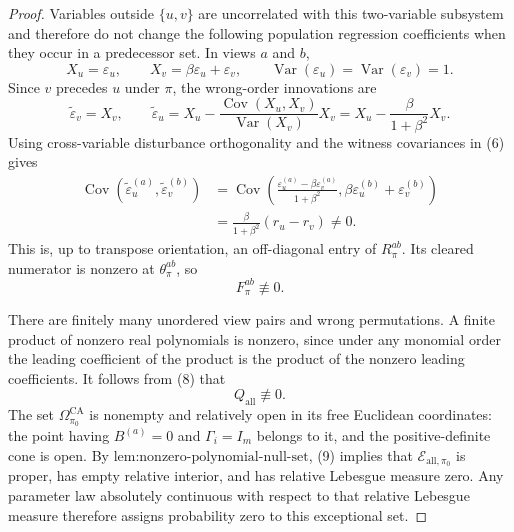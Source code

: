 \documentclass{article}
\begin{document}
\begin{proof}
Variables outside \(\{u,v\}\) are uncorrelated with this two-variable subsystem and therefore do not change the following population regression coefficients when they occur in a predecessor set.  In views \(a\) and \(b\),
\[
X_u=\varepsilon_u,
\qquad
X_v=\beta\varepsilon_u+\varepsilon_v,
\qquad
\operatorname{Var}(\varepsilon_u)=\operatorname{Var}(\varepsilon_v)=1.
\tag{5}
\]
Since \(v\) precedes \(u\) under \(\pi\), the wrong-order innovations are
\[
\widetilde\varepsilon_v=X_v,
\qquad
\widetilde\varepsilon_u
=X_u-\frac{\operatorname{Cov}(X_u,X_v)}{\operatorname{Var}(X_v)}X_v
=X_u-\frac{\beta}{1+\beta^2}X_v.
\tag{6}
\]
Using cross-variable disturbance orthogonality and the witness covariances in (6) gives
\[
\begin{aligned}
\operatorname{Cov}\!\left(\widetilde\varepsilon_u^{(a)},
\widetilde\varepsilon_v^{(b)}\right)
&=\operatorname{Cov}\!\left(
\frac{\varepsilon_u^{(a)}-\beta\varepsilon_v^{(a)}}{1+\beta^2},
\beta\varepsilon_u^{(b)}+\varepsilon_v^{(b)}\right)\\
&=\frac{\beta}{1+\beta^2}(r_u-r_v)\ne0.
\end{aligned}
\tag{7}
\]
This is, up to transpose orientation, an off-diagonal entry of \(R_\pi^{ab}\).  Its cleared numerator is nonzero at \(\theta_\pi^{ab}\), so
\[
F_\pi^{ab}\not\equiv0.
\tag{8}
\]

There are finitely many unordered view pairs and wrong permutations.  A finite product of nonzero real polynomials is nonzero, since under any monomial order the leading coefficient of the product is the product of the nonzero leading coefficients.  It follows from (8) that
\[
Q_{\mathrm{all}}\not\equiv0.
\tag{9}
\]
The set \(\Omega_{\pi_0}^{\mathrm{CA}}\) is nonempty and relatively open in its free Euclidean coordinates: the point having \(B^{(a)}=0\) and \(\Gamma_i=I_m\) belongs to it, and the positive-definite cone is open.  By \(\text{lem:nonzero-polynomial-null-set}\), (9) implies that \(\mathcal E_{\mathrm{all},\pi_0}\) is proper, has empty relative interior, and has relative Lebesgue measure zero.  Any parameter law absolutely continuous with respect to that relative Lebesgue measure therefore assigns probability zero to this exceptional set.


\end{proof}
\end{document}

